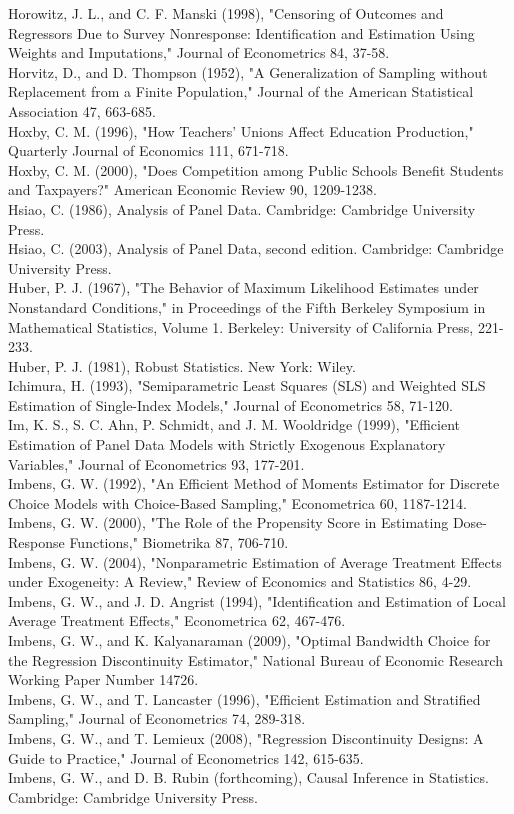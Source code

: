 \documentclass[10pt]{article}
\begin{document}
Horowitz, J. L., and C. F. Manski (1998), "Censoring of Outcomes and Regressors Due to Survey Nonresponse: Identification and Estimation Using Weights and Imputations," Journal of Econometrics 84, 37-58.\\
Horvitz, D., and D. Thompson (1952), "A Generalization of Sampling without Replacement from a Finite Population," Journal of the American Statistical Association 47, 663-685.\\
Hoxby, C. M. (1996), "How Teachers' Unions Affect Education Production," Quarterly Journal of Economics 111, 671-718.\\
Hoxby, C. M. (2000), "Does Competition among Public Schools Benefit Students and Taxpayers?" American Economic Review 90, 1209-1238.\\
Hsiao, C. (1986), Analysis of Panel Data. Cambridge: Cambridge University Press.\\
Hsiao, C. (2003), Analysis of Panel Data, second edition. Cambridge: Cambridge University Press.\\
Huber, P. J. (1967), "The Behavior of Maximum Likelihood Estimates under Nonstandard Conditions," in Proceedings of the Fifth Berkeley Symposium in Mathematical Statistics, Volume 1. Berkeley: University of California Press, 221-233.\\
Huber, P. J. (1981), Robust Statistics. New York: Wiley.\\
Ichimura, H. (1993), "Semiparametric Least Squares (SLS) and Weighted SLS Estimation of Single-Index Models," Journal of Econometrics 58, 71-120.\\
Im, K. S., S. C. Ahn, P. Schmidt, and J. M. Wooldridge (1999), "Efficient Estimation of Panel Data Models with Strictly Exogenous Explanatory Variables," Journal of Econometrics 93, 177-201.\\
Imbens, G. W. (1992), "An Efficient Method of Moments Estimator for Discrete Choice Models with Choice-Based Sampling," Econometrica 60, 1187-1214.\\
Imbens, G. W. (2000), "The Role of the Propensity Score in Estimating Dose-Response Functions," Biometrika 87, 706-710.\\
Imbens, G. W. (2004), "Nonparametric Estimation of Average Treatment Effects under Exogeneity: A Review," Review of Economics and Statistics 86, 4-29.\\
Imbens, G. W., and J. D. Angrist (1994), "Identification and Estimation of Local Average Treatment Effects," Econometrica 62, 467-476.\\
Imbens, G. W., and K. Kalyanaraman (2009), "Optimal Bandwidth Choice for the Regression Discontinuity Estimator," National Bureau of Economic Research Working Paper Number 14726.\\
Imbens, G. W., and T. Lancaster (1996), "Efficient Estimation and Stratified Sampling," Journal of Econometrics 74, 289-318.\\
Imbens, G. W., and T. Lemieux (2008), "Regression Discontinuity Designs: A Guide to Practice," Journal of Econometrics 142, 615-635.\\
Imbens, G. W., and D. B. Rubin (forthcoming), Causal Inference in Statistics. Cambridge: Cambridge University Press.
\end{document}
